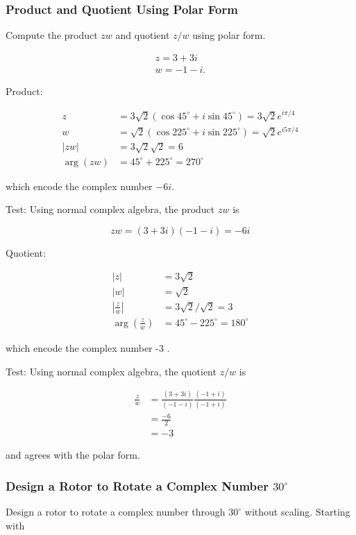 \documentclass[10pt]{article}
\begin{document}
\subsubsection{Product and Quotient Using Polar Form}
Compute the product $z w$ and quotient $z / w$ using polar form.

$$
\begin{gathered}
z=3+3 i \\
w=-1-i .
\end{gathered}
$$

Product:

$$
\begin{aligned}
z & =3 \sqrt{2}\left(\cos 45^{\circ}+i \sin 45^{\circ}\right)=3 \sqrt{2} e^{i \pi / 4} \\
w & =\sqrt{2}\left(\cos 225^{\circ}+i \sin 225^{\circ}\right)=\sqrt{2} e^{i 5 \pi / 4} \\
|z w| & =3 \sqrt{2} \sqrt{2}=6 \\
\arg (z w) & =45^{\circ}+225^{\circ}=270^{\circ}
\end{aligned}
$$

which encode the complex number $-6 i$.

Test: Using normal complex algebra, the product $z w$ is

$$
z w=(3+3 i)(-1-i)=-6 i
$$

Quotient:

$$
\begin{aligned}
|z| & =3 \sqrt{2} \\
|w| & =\sqrt{2} \\
\left|\frac{z}{w}\right| & =3 \sqrt{2} / \sqrt{2}=3 \\
\arg \left(\frac{z}{w}\right) & =45^{\circ}-225^{\circ}=180^{\circ}
\end{aligned}
$$

which encode the complex number -3 .

Test: Using normal complex algebra, the quotient $z / w$ is

$$
\begin{aligned}
\frac{z}{w} & =\frac{(3+3 i)}{(-1-i)} \frac{(-1+i)}{(-1+i)} \\
& =\frac{-6}{2} \\
& =-3
\end{aligned}
$$

and agrees with the polar form.

\subsubsection{Design a Rotor to Rotate a Complex Number $30^{\circ}$}
Design a rotor to rotate a complex number through $30^{\circ}$ without scaling. Starting with
\end{document}
